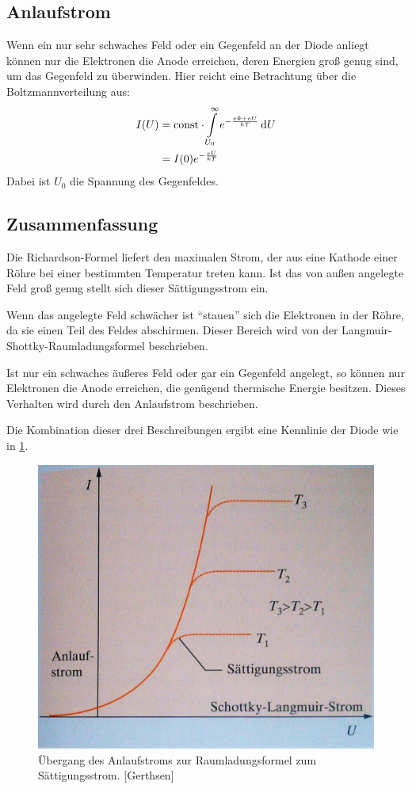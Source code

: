\subsection{Anlaufstrom}
\label{sub:anlaufstrom}
  Wenn ein nur sehr schwaches Feld oder ein Gegenfeld an der Diode anliegt können nur die Elektronen die Anode erreichen, deren Energien groß genug sind, um das Gegenfeld zu überwinden. Hier reicht eine Betrachtung über die Boltzmannverteilung aus:
  \begin{align}\label{equ:anlauf}
    I(U) &= \text{const} \cdot \integral{e^{-\frac{e \Phi + e U}{k T}}}{U}{U_0}{\infty} \\
         &= I(0) e^{-\frac{e U}{k T}}
  \end{align}
  Dabei ist $U_0$ die Spannung des Gegenfeldes.




\subsection{Zusammenfassung}
\label{sub:zusammenfassung}
  Die Richardson-Formel liefert den maximalen Strom, der aus eine Kathode einer  Röhre bei einer bestimmten Temperatur treten kann. Ist das von außen angelegte Feld groß genug stellt sich dieser Sättigungsstrom ein.
  \par
  Wenn das angelegte Feld schwächer ist ``stauen'' sich die Elektronen in der Röhre, da sie einen Teil des Feldes abschirmen. Dieser Bereich wird von der Langmuir-Shottky-Raumladungsformel beschrieben.
  \par
  Ist nur ein schwaches äußeres Feld oder gar ein Gegenfeld angelegt, so können nur Elektronen die Anode erreichen, die genügend thermische Energie besitzen. Dieses Verhalten wird durch den Anlaufstrom beschrieben.
  \par
  Die Kombination dieser drei Beschreibungen ergibt eine Kennlinie der Diode wie in \ref{fig:diode}.

  \begin{figure}[H]
    \centering
    \includegraphics[width=0.4\textheight]{../figures/diode.jpg}
    \caption{Übergang des Anlaufstroms zur Raumladungsformel zum Sättigungsstrom. [Gerthsen]}
    \label{fig:diode}
  \end{figure}
